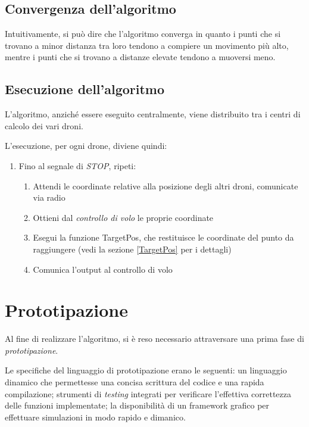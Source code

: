 \documentclass[11pt,a4paper]{report}
\newcommand{\name}[1]{{\ttfamily #1}}
\begin{document}
\section{Convergenza dell'algoritmo}

Intuitivamente, si può dire che l'algoritmo converga in quanto i punti che si trovano a minor distanza tra loro tendono a compiere un movimento più alto, mentre i punti che si trovano a distanze elevate tendono a muoversi meno.

\section{Esecuzione dell'algoritmo}

L'algoritmo, anziché essere eseguito centralmente, viene distribuito tra i centri di calcolo dei vari droni.

L'esecuzione, per ogni drone, diviene quindi:

\begin{enumerate}
	\item Fino al segnale di \textit{STOP}, ripeti:
	\begin{enumerate}
		\item Attendi le coordinate relative alla posizione degli altri droni, comunicate via radio
		\item Ottieni dal \textit{controllo di volo} le proprie coordinate
		\item Esegui la funzione \name{TargetPos}, che restituisce le coordinate del punto da raggiungere (vedi la sezione \ref{TargetPos} per i dettagli)
		\item Comunica l'output al controllo di volo
	\end{enumerate}
\end{enumerate}

\pagebreak

\chapter{Prototipazione}

Al fine di realizzare l'algoritmo, si è reso necessario attraversare una prima fase di \textit{prototipazione}.

Le specifiche del linguaggio di prototipazione erano le seguenti: un linguaggio dinamico che permettesse una concisa scrittura del codice e una rapida compilazione; strumenti di \textit{testing} integrati per verificare l'effettiva correttezza delle funzioni implementate; la disponibilità di un framework grafico per effettuare simulazioni in modo rapido e dimanico.
\end{document}
